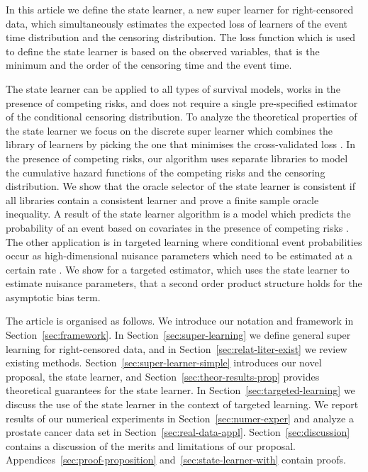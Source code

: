 \documentclass[unnumsec,webpdf,contemporary,large,namedate]{oup-authoring-template}%
\theoremstyle{thmstyleone}%
\theoremstyle{thmstyletwo}%
\theoremstyle{thmstylethree}%
\newcommand{\1}{\mathds{1}}
\begin{document}
In this article we define the state learner, a new super learner for
right-censored data, which simultaneously estimates the expected loss
of learners of the event time distribution and the censoring
distribution. The loss function which is used to define the state
learner is based on the observed variables, that is the minimum and
the order of the censoring time and the event
time.

The state learner can be applied to all types of survival models,
works in the presence of competing risks, and does not require a
single pre-specified estimator of the conditional censoring
distribution.  To analyze the theoretical properties of the state
learner we focus on the discrete super learner which combines the
library of learners by picking the one that minimises the
cross-validated loss \citep{van2007super}. In the presence of
competing risks, our algorithm uses separate libraries to model the
cumulative hazard functions of the competing risks and the censoring
distribution. We show that the oracle selector of the state learner is
consistent if all libraries contain a consistent learner and prove a
finite sample oracle inequality. A result of the state learner
algorithm is a model which predicts the probability of an event based
on covariates in the presence of competing risks
\citep{gerds2021medical}. The other application is in targeted
learning where conditional event probabilities occur as
high-dimensional nuisance parameters which need to be estimated at a
certain rate \citep{van2011targeted, rytgaard2021estimation,
  rytgaard2022targeted}. We show for a targeted estimator, which uses
the state learner to estimate nuisance parameters, that a second order
product structure holds for the asymptotic bias term.

The article is organised as follows. We introduce our notation and
framework in Section~\ref{sec:framework}. In
Section~\ref{sec:super-learning} we define general super learning
for right-censored data, and in Section~\ref{sec:relat-liter-exist}
we review existing methods.  Section~\ref{sec:super-learner-simple}
introduces our novel proposal, the state learner, and
Section~\ref{sec:theor-results-prop} provides theoretical guarantees
for the state learner. In Section~\ref{sec:targeted-learning} we
discuss the use of the state learner in the context of targeted
learning. We report results of our numerical experiments in
Section~\ref{sec:numer-exper} and analyze a prostate cancer data set
in Section~\ref{sec:real-data-appl}.  Section~\ref{sec:discussion}
contains a discussion of the merits and limitations of our
proposal. Appendices~\ref{sec:proof-proposition}
and~\ref{sec:state-learner-with} contain proofs.
\end{document}

